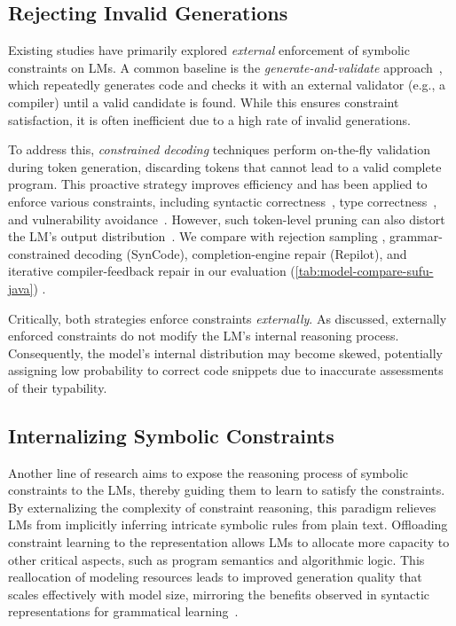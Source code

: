 \documentclass[manuscript,screen]{acmart}
\begin{document}
\subsection{Rejecting Invalid Generations}
Existing studies have primarily explored \emph{external} enforcement of symbolic constraints    {\color{revblue}on } LMs.
%
A common baseline is the \emph{generate-and-validate} approach~\cite{DBLP:conf/sigsoft/ZhuSXZY0Z21,DBLP:conf/popl/LongR16}, which repeatedly generates code and checks it with an external validator (e.g., a compiler) until a valid candidate is found. While this ensures constraint satisfaction, it is often inefficient due to a high rate of invalid generations.

To address this, \emph{constrained decoding} techniques perform on-the-fly validation during token generation, discarding tokens that cannot lead to a valid complete program. This proactive strategy improves efficiency and has been applied to enforce various constraints, including syntactic correctness~\cite{ugare2024syncodellmgenerationgrammar}, type correctness~\cite{DBLP:journals/corr/abs-2504-09246}, and vulnerability avoidance~\cite{DBLP:conf/issre/StorhaugLH23}. However, such token-level pruning can also distort the LM's output distribution~\cite{DBLP:conf/nips/ParkWBPD24}. We compare with rejection sampling {\color{revblue}, grammar-constrained decoding (SynCode), completion-engine repair (Repilot), and iterative compiler-feedback repair } in our evaluation (\autoref{tab:model-compare-sufu-java})  .

Critically, both strategies enforce constraints \emph{externally}. As discussed, externally enforced constraints do not modify the LM's internal reasoning process. Consequently, the model's internal distribution may become skewed, potentially assigning low probability to correct code snippets due to inaccurate assessments of their typability.

\subsection{Internalizing Symbolic Constraints}
Another line of research aims to expose the reasoning process of symbolic constraints to the LMs, thereby guiding them to learn to satisfy the constraints.
%
By externalizing the complexity of constraint reasoning, this paradigm relieves LMs from implicitly inferring intricate symbolic rules from plain text. Offloading constraint learning to the representation allows LMs to allocate more capacity to other critical aspects, such as program semantics and algorithmic logic. This reallocation of modeling resources leads to improved generation quality that scales effectively with model size, mirroring the benefits observed in syntactic representations for grammatical learning~\cite{DBLP:conf/acl/LiangZ0LLXCZZZC25}.
\end{document}

